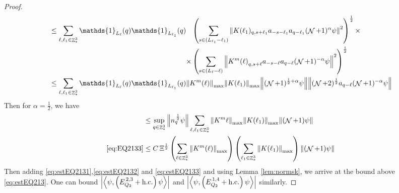 \documentclass[sn-mathphys, Numbered ,a4paper]{sn-jnl}%
\DeclareMathOperator{\Z}{\mathbb{Z}}
\DeclareMathOperator{\NN}{\mathcal{N}}
\newcommand{\half}{\frac{1}{2}}
\newcommand{\eva}[1]{\left\langle #1 \right\rangle}
\theoremstyle{plain}
\theoremstyle{definition}
\theoremstyle{remark}
\theoremstyle{plain}
\theoremstyle{definition}
\theoremstyle{remark}
\begin{document}
\begin{proof}
\begin{align}
    &\leq \sum\limits_{\ell, \ell_1\in \Z^3_*} \mathds{1}_{L_{\ell}}(q) \mathds{1}_{L_{\ell_1}}(q) \begin{aligned}[t]&\left(\sum\limits_{ s \in  (L_{\ell_1}-\ell_1)} \norm{K(\ell_1)_{q,s+\ell_1} a_{-s-\ell_1} a_{q-\ell_1}  (\NN+1)^{\alpha}\psi}^2\right)^\half \times \nonumber\\ \times &\left( \sum\limits_{ s \in (L_{\ell}-\ell) } \norm{ K^m{(\ell)}_{q,s+\ell}  a_{-s-\ell} a_{q-\ell} (\NN+1)^{-\alpha} \psi }^2\right)^\half \end{aligned}\nonumber\\
    &\leq \sum\limits_{\ell, \ell_1\in \Z^3_*} \mathds{1}_{L_{\ell}}(q) \mathds{1}_{L_{\ell_1}}(q) \norm{K^m{(\ell)}}_{\mathrm{max}} \norm{K(\ell_1)}_{\mathrm{max}} \norm{ (\NN+1)^{\half+\alpha}\psi} \norm{  (\NN+2)^\half  a_{q-\ell} (\NN+1)^{-\alpha} \psi } \nonumber
\end{align} 
Then for $\alpha = \half$, we have
\begin{align}
	&\leq  \sup\limits_{q \in \Z^3_*} \norm{ n_{q}^{\,\half} \psi } \sum\limits_{\ell, \ell_1\in \Z^3_*}  \norm{K^m{\ell}}_{\mathrm{max}} \norm{K(\ell_1)}_{\mathrm{max}} \norm{ (\NN+1) \psi}  \nonumber\\
	\eqref{eq:EQ2133}&\leq C\, \Xi^\half \left(\sum\limits_{\ell\in \Z^3_*} \norm{K^m(\ell)}_{\mathrm{max}}\right)\left(  \sum\limits_{ \ell_1\in \Z^3_*}  \norm{ K(\ell_1)}_{\mathrm{max}} \right) \norm{ (\NN+1) \psi}\label{eq:estEQ2133} 
\end{align}
Then adding \eqref{eq:estEQ2131},\eqref{eq:estEQ2132} and \eqref{eq:estEQ2133} and using Lemma \ref{lem:normsk}, we arrive at the bound above \eqref{eq:estEQ213}. One can bound $\abs{\eva{\psi,\left(E^{\,2,3}_{Q_2}+\mathrm{h.c.}\right) \psi }}$ and $\abs{\eva{\psi,\left(E^{\,1,4}_{Q_2}+\mathrm{h.c.}\right) \psi }}$ similarly.
\end{proof}
\end{document}
